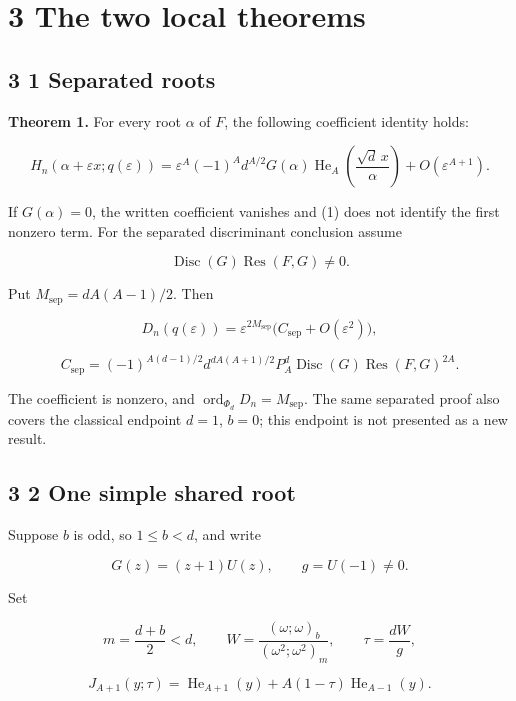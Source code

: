 \documentclass[
  11pt,
]{article}
\begin{document}
\section{3 The two local theorems}\label{the-two-local-theorems}

\subsection{3 1 Separated roots}\label{separated-roots}

\textbf{Theorem 1.} For every root \(\alpha\) of \(F\), the following
coefficient identity holds:

\[
H_n(\alpha+\varepsilon x;q(\varepsilon))
=\varepsilon^A(-1)^A d^{A/2}G(\alpha)
\operatorname{He}_A\!\left(\frac{\sqrt d\,x}{\alpha}\right)
+O(\varepsilon^{A+1}). \tag{1}
\]

If \(G(\alpha)=0\), the written coefficient vanishes and (1) does not
identify the first nonzero term. For the separated discriminant
conclusion assume

\[
\operatorname{Disc}(G)\operatorname{Res}(F,G)\ne 0. \tag{2}
\]

Put \(M_{\mathrm{sep}}=dA(A-1)/2\). Then

\[
D_n(q(\varepsilon))=
\varepsilon^{2M_{\mathrm{sep}}}
\bigl(C_{\mathrm{sep}}+O(\varepsilon^2)\bigr), \tag{3}
\]

\[
C_{\mathrm{sep}}=
(-1)^{A(d-1)/2}d^{dA(A+1)/2}P_A^d
\operatorname{Disc}(G)\operatorname{Res}(F,G)^{2A}. \tag{4}
\]

The coefficient is nonzero, and
\(\operatorname{ord}_{\Phi_d}D_n=M_{\mathrm{sep}}\). The same separated
proof also covers the classical endpoint \(d=1\), \(b=0\); this endpoint
is not presented as a new result.

\subsection{3 2 One simple shared root}\label{one-simple-shared-root}

Suppose \(b\) is odd, so \(1\leq b<d\), and write

\[
G(z)=(z+1)U(z),\qquad g=U(-1)\ne 0.
\]

Set

\[
m=\frac{d+b}{2}<d,\qquad
W=\frac{(\omega;\omega)_b}{(\omega^2;\omega^2)_m},
\qquad \tau=\frac{dW}{g}, \tag{5}
\]

\[
J_{A+1}(y;\tau)=\operatorname{He}_{A+1}(y)
+A(1-\tau)\operatorname{He}_{A-1}(y). \tag{6}
\]
\end{document}
